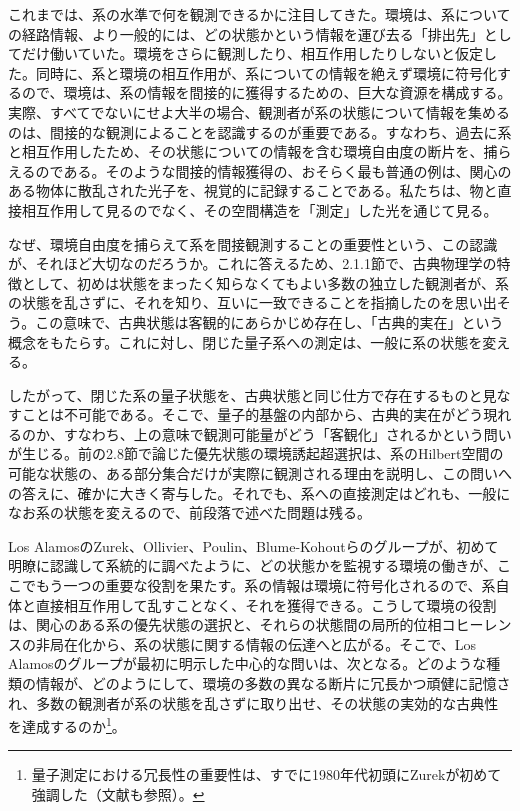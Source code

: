 

これまでは、系の水準で何を観測できるかに注目してきた。環境は、系についての経路情報、より一般的には、どの状態かという情報を運び去る「排出先」としてだけ働いていた。環境をさらに観測したり、相互作用したりしないと仮定した。同時に、系と環境の相互作用が、系についての情報を絶えず環境に符号化するので、環境は、系の情報を間接的に獲得するための、巨大な資源を構成する。実際、すべてでないにせよ大半の場合、観測者が系の状態について情報を集めるのは、間接的な観測によることを認識するのが重要である。すなわち、過去に系と相互作用したため、その状態についての情報を含む環境自由度の断片を、捕らえるのである。そのような間接的情報獲得の、おそらく最も普通の例は、関心のある物体に散乱された光子を、視覚的に記録することである。私たちは、物と直接相互作用して見るのでなく、その空間構造を「測定」した光を通じて見る。

なぜ、環境自由度を捕らえて系を間接観測することの重要性という、この認識が、それほど大切なのだろうか。これに答えるため、2.1.1節で、古典物理学の特徴として、初めは状態をまったく知らなくてもよい多数の独立した観測者が、系の状態を乱さずに、それを知り、互いに一致できることを指摘したのを思い出そう。この意味で、古典状態は客観的にあらかじめ存在し、「古典的実在」という概念をもたらす。これに対し、閉じた量子系への測定は、一般に系の状態を変える。

\hypertarget{srcpage:86}{}\label{srcpage:86}
したがって、閉じた系の量子状態を、古典状態と同じ仕方で存在するものと見なすことは不可能である。そこで、量子的基盤の内部から、古典的実在がどう現れるのか、すなわち、上の意味で観測可能量がどう「客観化」されるかという問いが生じる。前の2.8節で論じた優先状態の環境誘起超選択は、系のHilbert空間の可能な状態の、ある部分集合だけが実際に観測される理由を説明し、この問いへの答えに、確かに大きく寄与した。それでも、系への直接測定はどれも、一般になお系の状態を変えるので、前段落で述べた問題は残る。

Los AlamosのZurek、Ollivier、Poulin、Blume-Kohoutらのグループ\cite{ref016,ref066,ref076,ref084,ref104,ref110,ref111,ref112,ref113}が、初めて明瞭に認識して系統的に調べたように、どの状態かを監視する環境の働きが、ここでもう一つの重要な役割を果たす。系の情報は環境に符号化されるので、系自体と直接相互作用して乱すことなく、それを獲得できる。こうして環境の役割は、関心のある系の優先状態の選択と、それらの状態間の局所的位相コヒーレンスの非局在化から、系の状態に関する情報の伝達へと広がる。そこで、Los Alamosのグループが最初に明示した中心的な問いは、次となる。どのような種類の情報が、どのようにして、環境の多数の異なる断片に冗長かつ頑健に記憶され、多数の観測者が系の状態を乱さずに取り出せ、その状態の実効的な古典性を達成するのか\footnote{量子測定における冗長性の重要性は、すでに1980年代初頭にZurek\cite{ref076}が初めて強調した（文献\cite{ref009}も参照）。}。

